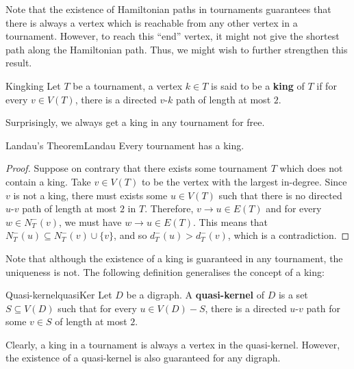 \documentclass[math, code]{amznotes}
\theoremstyle{remark}
\begin{document}
Note that the existence of Hamiltonian paths in tournaments guarantees that there is always a vertex which is reachable from any other vertex in a tournament. However, to reach this ``end'' vertex, it might not give the shortest path along the Hamiltonian path. Thus, we might wish to further strengthen this result.
\begin{dfnbox}{King}{king}
    Let $T$ be a tournament, a vertex $k \in T$ is said to be a {\color{red} \textbf{king}} of $T$ if for every $v \in V(T)$, there is a directed $v$-$k$ path of length at most $2$.
\end{dfnbox}
Surprisingly, we always get a king in any tournament for free.
\begin{thmbox}{Landau's Theorem}{Landau}
    Every tournament has a king.
    \tcblower
    \begin{proof}
        Suppose on contrary that there exists some tournament $T$ which does not contain a king. Take $v \in V(T)$ to be the vertex with the largest in-degree. Since $v$ is not a king, there must exists some $u \in V(T)$ such that there is no directed $u$-$v$ path of length at most $2$ in $T$. Therefore, $v \to u \in E(T)$ and for every $w \in N_T^-(v)$, we must have $w \to u \in E(T)$. This means that $N_T^-(u) \subseteq N_T^-(v) \cup \{v \}$, and so $d_T^-(u) > d_T^-(v)$, which is a contradiction.
    \end{proof}
\end{thmbox}
Note that although the existence of a king is guaranteed in any tournament, the uniqueness is not. The following definition generalises the concept of a king:
\begin{dfnbox}{Quasi-kernel}{quasiKer}
    Let $D$ be a digraph. A {\color{red} \textbf{quasi-kernel}} of $D$ is a set $S \subseteq V(D)$ such that for every $u \in V(D) - S$, there is a directed $u$-$v$ path for some $v \in S$ of length at most $2$.
\end{dfnbox}
Clearly, a king in a tournament is always a vertex in the quasi-kernel. However, the existence of a quasi-kernel is also guaranteed for any digraph.
\end{document}
